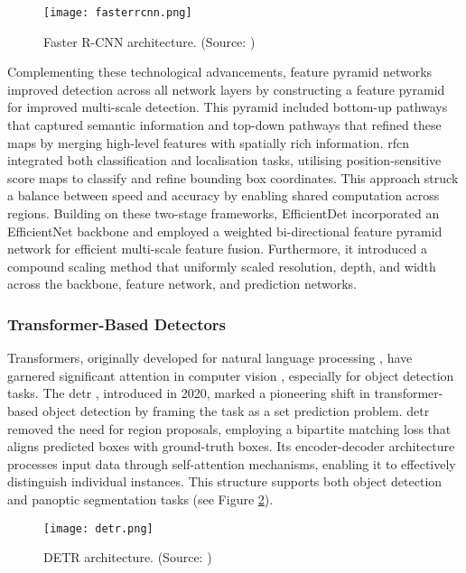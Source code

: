 \begin{figure}[ht]
    \centering
    \texttt{[image: fasterrcnn.png]}
    \caption{Faster R-CNN architecture. (Source: \cite{fasterrcnn})}
    \label{fig:fasterrcnn}
\end{figure}

Complementing these technological advancements, feature pyramid networks \cite{fpn} improved detection across all network layers by constructing a feature pyramid for improved multi-scale detection. This pyramid included bottom-up pathways that captured semantic information and top-down pathways that refined these maps by merging high-level features with spatially rich information. \gls{rfcn} \cite{rfcn} integrated both classification and localisation tasks, utilising position-sensitive score maps to classify and refine bounding box coordinates. This approach struck a balance between speed and accuracy by enabling shared computation across regions.
Building on these two-stage frameworks, EfficientDet \cite{efficientdet} incorporated an EfficientNet \cite{efficientnet} backbone and employed a weighted bi-directional feature pyramid network for efficient multi-scale feature fusion. Furthermore, it introduced a compound scaling method that uniformly scaled resolution, depth, and width across the backbone, feature network, and prediction networks.

\subsubsection{Transformer-Based Detectors}
\label{subsubsec:2_transformers}

Transformers, originally developed for natural language processing \cite{transformers}, have garnered significant attention in computer vision \cite{visiontransformer}, especially for object detection tasks. The \gls{detr} \cite{detr}, introduced in 2020, marked a pioneering shift in transformer-based object detection by framing the task as a set prediction problem. \gls{detr} removed the need for region proposals, employing a bipartite matching loss that aligns predicted boxes with ground-truth boxes. Its encoder-decoder architecture processes input data through self-attention mechanisms, enabling it to effectively distinguish individual instances. This structure supports both object detection and panoptic segmentation tasks (see Figure \ref{fig:detr}).

\begin{figure}[ht]
    \centering
    \texttt{[image: detr.png]}
    \caption{DETR architecture. (Source: \cite{detr})}
    \label{fig:detr}
\end{figure}

